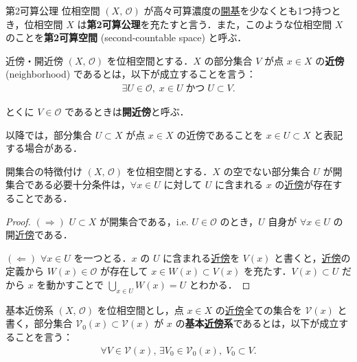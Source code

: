 \documentclass[geometry_main]{subfiles}
\begin{document}
\begin{mydef}[label=def:second-countable]{第2可算公理}
	位相空間 $(X,\, \mathscr{O})$ が高々可算濃度の\hyperref[def.opbase]{開基}を少なくとも1つ持つとき，位相空間 $X$ は\textbf{第2可算公理}を充たすと言う．また，このような位相空間 $X$ のことを\textbf{第2可算空間} (second-countable space) と呼ぶ．
\end{mydef}

\begin{mydef}[label=def:neighborhood]{近傍・開近傍}
	$(X,\, \mathscr{O})$ を位相空間とする．$X$ の部分集合 $V$ が点 $x \in X$ の\textbf{近傍} (neighborhood) であるとは，以下が成立することを言う：
	\begin{align}
		\exists U \in \mathscr{O},\;  x \in U\; \text{かつ}\; U \subset V.
	\end{align}
	
	とくに $V \in \mathscr{O}$ であるときは\textbf{開近傍}と呼ぶ．
\end{mydef}

以降では，部分集合 $U \subset X$ が点 $x \in X$ の近傍であることを $x \in U \subset X$ と表記する場合がある．

\begin{myprop}[label=prop.opdet]{開集合の特徴付け}
	$(X,\, \mathscr{O})$ を位相空間とする．$X$ の空でない部分集合 $U$ が開集合である必要十分条件は，$\forall x \in U$ に対して $U$ に含まれる $x$ の\hyperref[def:neighborhood]{近傍}が存在することである．
\end{myprop}
\begin{proof}
	$(\Longrightarrow)$ $U \subset X$ が開集合である，i.e. $U \in \mathscr{O}$ のとき，$U$ 自身が $\forall x \in U$ の開\hyperref[def:neighborhood]{近傍}である．

	$(\Longleftarrow)$ $\forall x \in U$ を一つとる．$x$ の $U$ に含まれる\hyperref[def:neighborhood]{近傍}を $V(x)$ と書くと，\hyperref[def:neighborhood]{近傍}の定義から $W(x) \in \mathscr{O}$ が存在して $x \in W(x) \subset V(x)$ を充たす．$V(x) \subset U$ だから $x$ を動かすことで $\bigcup_{x \in U} W(x) =U$ とわかる． 
\end{proof}

\begin{mydef}{基本近傍系}
	$(X,\, \mathscr{O})$ を位相空間とし，点 $x \in X$ の\hyperref[def:neighborhood]{近傍}全ての集合を $\mathscr{V}(x)$ と書く，部分集合 $\mathscr{V}_0(x) \subset \mathscr{V}(x)$ が $x$ の\textbf{基本\hyperref[def:neighborhood]{近傍}系}であるとは，以下が成立することを言う：
	\begin{align}
		\forall V \in \mathscr{V}(x),\, \exists V_0 \in \mathscr{V}_0(x),\; V_0 \subset V.
	\end{align}
\end{mydef}
\end{document}
